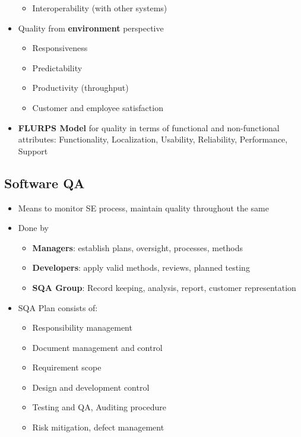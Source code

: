 \documentclass{article}
\begin{document}
\begin{itemize}
\begin{itemize}
        \item Interoperability (with other systems)
    \end{itemize}
    
    \item Quality from \textbf{environment} perspective
    \begin{itemize}
        \item Responsiveness
        
        \item Predictability
        
        \item Productivity (throughput)
        
        \item Customer and employee satisfaction
    \end{itemize}
    
    \item \textbf{FLURPS Model} for quality in terms of functional and non-functional attributes: Functionality, Localization, Usability, Reliability, Performance, Support
\end{itemize}
\subsection{Software QA}
\begin{itemize}
    \item Means to monitor SE process, maintain quality throughout the same
    
    \item Done by 
    \begin{itemize}
        \item \textbf{Managers}: establish plans, oversight, processes, methods
        
        \item \textbf{Developers}: apply valid methods, reviews, planned testing
        
        \item \textbf{SQA Group}: Record keeping, analysis, report, customer representation
    \end{itemize}
    
    \item SQA Plan consists of:
    \begin{itemize}
        \item Responsibility management
        
        \item Document management and control
        
        \item Requirement scope
        
        \item Design and development control
        
        \item Testing and QA, Auditing procedure
        
        \item Risk mitigation, defect management
    \end{itemize}

\end{itemize}
\end{document}
